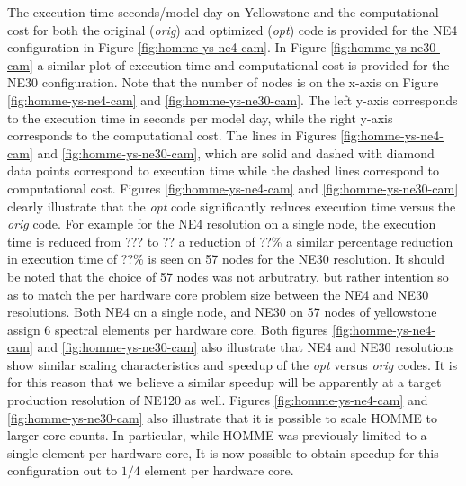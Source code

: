 The execution time seconds/model day on Yellowstone and the computational cost for both the original ({\em orig})  and optimized ({\em opt}) code is provided for the NE4 configuration in Figure \ref{fig:homme-ys-ne4-cam}. In Figure \ref{fig:homme-ys-ne30-cam} a similar plot of execution time and computational cost is provided for the NE30 configuration.  Note that the number of nodes is on the x-axis on Figure \ref{fig:homme-ys-ne4-cam} and \ref{fig:homme-ys-ne30-cam}.  The left y-axis corresponds to the execution time in seconds per model day, while the right y-axis corresponds to the computational cost. The lines in Figures \ref{fig:homme-ys-ne4-cam} and \ref{fig:homme-ys-ne30-cam}, which are solid and dashed with diamond data points correspond to execution time while the dashed lines  correspond to computational cost.  Figures  \ref{fig:homme-ys-ne4-cam} and \ref{fig:homme-ys-ne30-cam} clearly illustrate that the {\em opt} code significantly reduces execution time versus the {\em orig} code.  For example for the NE4 resolution on a single node, the execution time is reduced from {\color{red} ??? to ?? a reduction of ??\%} a similar percentage reduction in execution time of {\color{red} ??\%} is seen on 57 nodes for the NE30 resolution.  It should be  noted that the choice of 57 nodes was not arbutratry, but rather intention so as to match the per hardware core problem size between the NE4 and NE30 resolutions.  Both  NE4 on a single node, and NE30 on 57 nodes of yellowstone assign 6 spectral elements per hardware core.  Both figures \ref{fig:homme-ys-ne4-cam} and \ref{fig:homme-ys-ne30-cam} also illustrate that NE4 and NE30 resolutions show similar scaling characteristics and speedup of the {\em opt} versus {\em orig} codes. It is for this reason that we believe a similar speedup will be apparently at a target production resolution of NE120 as well.   Figures \ref{fig:homme-ys-ne4-cam} and \ref{fig:homme-ys-ne30-cam} also illustrate that it is possible to scale HOMME to larger core counts.  In particular, while HOMME was previously limited to a single element per hardware core, It is now possible to obtain speedup for this configuration out to $1/4$ element per hardware core.
 
